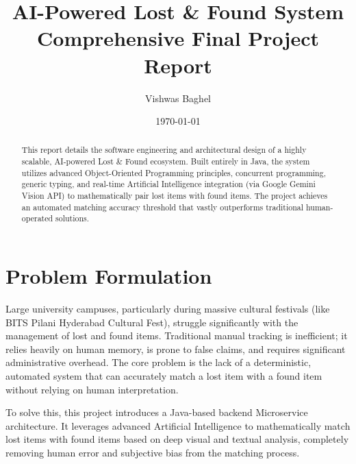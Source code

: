 \documentclass[12pt,a4paper]{article}
\title{\textbf{AI-Powered Lost \& Found System} \\ \large Comprehensive Final Project Report}
\author{Vishwas Baghel}
\date{\today}
\begin{document}
\maketitle
\begin{abstract}
This report details the software engineering and architectural design of a highly scalable, AI-powered Lost \& Found ecosystem. Built entirely in Java, the system utilizes advanced Object-Oriented Programming principles, concurrent programming, generic typing, and real-time Artificial Intelligence integration (via Google Gemini Vision API) to mathematically pair lost items with found items. The project achieves an automated matching accuracy threshold that vastly outperforms traditional human-operated solutions.
\end{abstract}

\tableofcontents
\newpage

\section{Problem Formulation}
Large university campuses, particularly during massive cultural festivals (like BITS Pilani Hyderabad Cultural Fest), struggle significantly with the management of lost and found items. Traditional manual tracking is inefficient; it relies heavily on human memory, is prone to false claims, and requires significant administrative overhead. The core problem is the lack of a deterministic, automated system that can accurately match a lost item with a found item without relying on human interpretation.

To solve this, this project introduces a Java-based backend Microservice architecture. It leverages advanced Artificial Intelligence to mathematically match lost items with found items based on deep visual and textual analysis, completely removing human error and subjective bias from the matching process.
\end{document}
